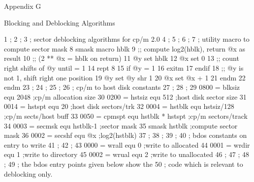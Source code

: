 

                                     Appendix G

                         Blocking and Deblocking Algorithms



  1                ;
  2                ;
  3                ;         sector deblocking algorithms for cp/m 2.0
  4                ;
  5                ;
  6                ;
  7                ;         utility macro to compute sector mask
  8                smask     macro    hblk
  9                ;;        compute log2(hblk), return @x as result
 10                ;;        (2 ** @x = hblk on return)
 11                @y        set      hblk
 12                @x        set      0
 13                ;;        count right shifts of @y until = 1
 14                          rept     8
 15                          if       @y = 1
 16                          exitm
 17                          endif
 18                ;;        @y is not 1, shift right one position
 19                @y        set      @y shr 1
 20                @x        set      @x + 1
 21                          endm
 22                          endm
 23                ;
 24                ;
 25                ;
 26                ;         cp/m to host disk constants
 27                ;
 28                ;
 29    0800 =      blksiz    equ      2048                   ;cp/m allocation size
 30    0200 =      hstsiz    equ      512                    ;host disk sector size
 31    0014 =      hstspt    equ      20                     ;host disk sectors/trk
 32    0004 =      hstblk    equ      hstsiz/128             ;cp/m sects/host buff
 33    0050 =      cpmspt    equ      hstblk * hstspt        ;cp/m sectors/track
 34    0003 =      secmsk    equ      hstblk-1               ;sector mask
 35                          smask    hstblk                 ;compute sector mask
 36    0002 =      secshf    equ      @x                     ;log2(hstblk)
 37                ;
 38                ;
 39                ;
 40                ;         bdos constants on entry to write
 41                ;
 42                ;
 43    0000 =      wrall     equ      0                      ;write to allocated
 44    0001 =      wrdir     equ      1                      ;write to directory
 45    0002 =      wrual     equ      2                      ;write to unallocated
 46                ;
 47                ;
 48                ;
 49                ;         the bdos entry points given below show the
 50                ;         code which is relevant to deblocking only.
